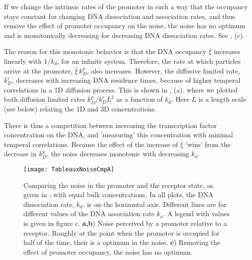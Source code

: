 If we change the intrinsic rates of the promoter in such a way that the occupancy stays constant for changing DNA dissociation and association rates, and thus remove the effect of promoter occupancy on the noise, the noise has no optimum and is monotonically decreasing for decreasing DNA dissociation rates. See , (c). 

The reason for this monotonic behavior is that the DNA occupancy $\bar{\xi}$ increases linearly with $1/k_d$, for an infinite system. Therefore, the rate at which particles arrive at the promoter, $\bar{\xi}\,k_D^p$, also increases. However, the diffusive limited rate, $k_D^r$, decreases with increasing DNA residence times, because of higher temperal correlations in a 1D diffusion process. This is shown in , (a). where we plotted both diffusion limited rates $k_D^p/k_D^r L^{2}$ as a function of $k_d$. Here $L$ is a length scale (see below) relating the 1D and 3D concentrations. 

There is thus a competition between increasing the transcription factor concentration on the DNA, and 'measuring' this concentration with minimal temperal correlations. Because the effect of the increase of $\bar{\xi}$ 'wins' from the decrease in $k_D^p$, the noise decreases monotonic with decreasing $k_d$.

\begin{figure}[ht!]
\centering
\texttt{[image: TableauxNoiseCmpA]}
\caption{ Comparing the noise in the promoter and the receptor state, as given in , with equal bulk concentrations. In all plots, the DNA dissociation rate, $k_d$, is on the horizontal axis. Different lines are for different values of the DNA association rate $k_a$. A legend with values is given in figure c. {\bf a,b}) Noise perceived by a promoter relative to a receptor. Roughly at the point when the promoter is occupied for half of the time, their is a optimum in the noise. {\bf c}) Removing the effect of promoter occupancy, the noise has no optimum.
}
\end{figure}


